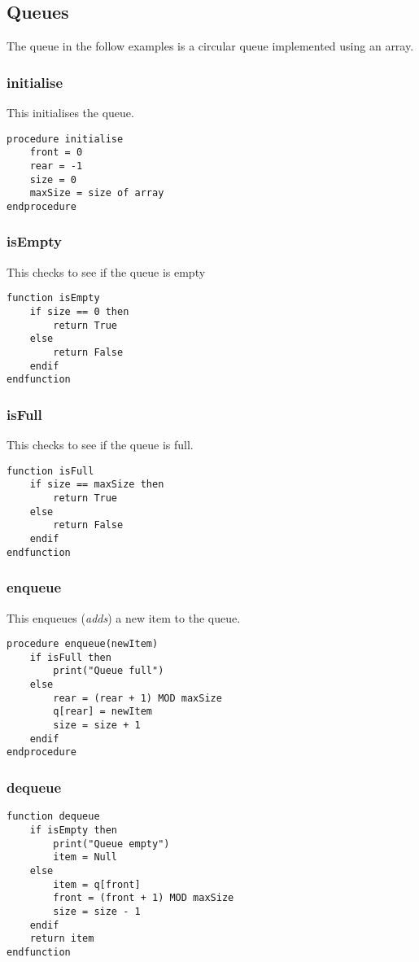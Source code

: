 \documentclass[a4paper,11pt]{article}
\begin{document}
\subsection{Queues}
The queue in the follow examples is a circular queue implemented using an array.
\subsubsection{initialise}
This initialises the queue.
\begin{Verbatim}[breaklines=true, breakanywhere=true]
procedure initialise
    front = 0
    rear = -1
    size = 0
    maxSize = size of array
endprocedure
\end{Verbatim}
\subsubsection{isEmpty}
This checks to see if the queue is empty
\begin{Verbatim}[breaklines=true, breakanywhere=true]
function isEmpty
    if size == 0 then
        return True
    else
        return False
    endif
endfunction
\end{Verbatim}
\subsubsection{isFull}
This checks to see if the queue is full.
\begin{Verbatim}[breaklines=true, breakanywhere=true]
function isFull
    if size == maxSize then
        return True
    else
        return False
    endif
endfunction
\end{Verbatim}
\subsubsection{enqueue}
This enqueues (\textit{adds}) a new item to the queue.
\begin{Verbatim}[breaklines=true, breakanywhere=true]
procedure enqueue(newItem)
    if isFull then
        print("Queue full")
    else
        rear = (rear + 1) MOD maxSize
        q[rear] = newItem
        size = size + 1
    endif
endprocedure
\end{Verbatim}
\subsubsection{dequeue}
\begin{Verbatim}[breaklines=true, breakanywhere=true]
function dequeue
    if isEmpty then
        print("Queue empty")
        item = Null
    else
        item = q[front]
        front = (front + 1) MOD maxSize
        size = size - 1
    endif
    return item
endfunction
\end{Verbatim}
\end{document}
